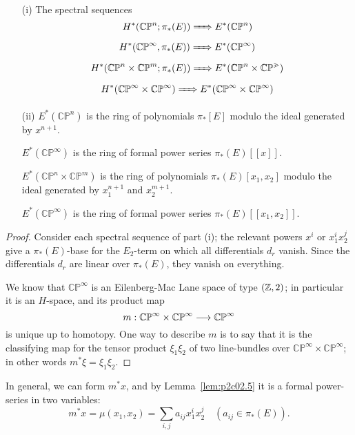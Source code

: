 \documentclass[../main]{subfiles}
\begin{document}
\begin{lemma}
\label{lem:p2c02.5}
\begin{enumerate}
    \item[(i)] The spectral sequences $$H^\ast(\mathbb {CP}^n; \pi_\ast(E)) \xRightarrow{\phantom{.....}} E^\ast(\mathbb {CP}^n)$$
    $$H^\ast(\mathbb {CP}^\infty, \pi_\ast(E))  \xRightarrow{\phantom{.....}} E^\ast(\mathbb {CP}^\infty)$$
    $$H^\ast(\mathbb {CP}^n \times \mathbb {CP}^m; \pi_\ast(E))  \xRightarrow{\phantom{.....}} E^\ast(\mathbb {CP}^n \times \mathbb {CP^m})$$
    $$H^\ast(\mathbb {CP}^\infty \times \mathbb {CP}^\infty)  \xRightarrow{\phantom{.....}} E^\ast(\mathbb {CP}^\infty \times \mathbb {CP}^\infty)$$
    \item[(ii)] $E^\ast(\mathbb {CP}^n)$ is the ring of polynomials $\pi_\ast[E]$ modulo the ideal generated by $x^{n + 1}$.
    
    $E^\ast(\mathbb {CP}^\infty)$ is the ring of formal power series $\pi_\ast(E)[\![x]\!]$.
    
    $E^\ast(\mathbb {CP}^n \times \mathbb {CP}^m)$ is the ring of polynomials $\pi_\ast(E)[x_1, x_2]$ modulo the ideal generated by $x_1^{n + 1}$ and $x_2^{m + 1}$.
    
    $E^\ast(\mathbb {CP}^\infty)$ is the ring of formal power series $\pi_\ast(E)[\![x_1, x_2]\!]$.
\end{enumerate}
\end{lemma}
\begin{proof}
Consider each spectral sequence of part (i); the relevant powers $x^i$ or $x_1^i x_2^j$ give a $\pi_\ast(E)$-base for the $E_2$-term on which all differentials $d_r$ vanish. Since the differentials $d_r$ are linear over $\pi_\ast(E)$, they vanish on everything.

We know that $\mathbb {CP}^\infty$ is an Eilenberg-Mac Lane space of type $(\mathbb{Z}, 2)$; in particular it is an $H$-space, and its product map $$m : \mathbb {CP}^\infty \times \mathbb {CP}^\infty \overset{}{\longrightarrow} \mathbb {CP}^\infty$$ is unique up to homotopy. One way to describe $m$ is to say that it is the classifying map for the tensor product $\xi_1 \xi_2$ of two line-bundles over $\mathbb {CP}^\infty \times \mathbb {CP}^\infty$; in other words $m^\ast \xi = \xi_1 \xi_2$. 
\end{proof}

In general, we can form $m^\ast x$, and by Lemma~\ref{lem:p2c02.5} it is a formal power-series in two variables:
\begin{equation}
\tag{2.6}
\label{eqn:p2c02.6}
m^\ast x = \mu(x_1, x_2) = \sum_{i, j} a_{ij} x_1^i x_2^j \quad (a_{ij} \in \pi_\ast(E)).
\end{equation}
\end{document}
